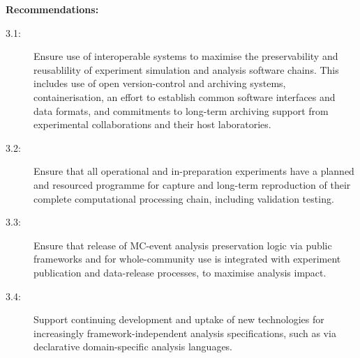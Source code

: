 \documentclass[11pt]{article}
\begin{document}


\noindent
\textbf{Recommendations:}


\begin{description}
   \item[3.1:] Ensure use of interoperable systems to maximise the preservability and reusablility of experiment simulation and analysis software chains. This includes use of open version-control and archiving systems, containerisation, an effort to establish common software interfaces and data formats, and commitments to long-term archiving support from experimental collaborations and their host laboratories.
   
   \item[3.2:] Ensure that all operational and in-preparation experiments have a planned and resourced programme for capture and long-term reproduction of their complete computational processing chain, including validation testing.
   
   \item[3.3:] Ensure that release of MC-event \gls{analysis preservation} logic via public frameworks and for whole-community use is integrated with experiment publication and data-release processes, to maximise analysis impact.
   \item[3.4:] Support continuing development and uptake of new technologies for increasingly framework-independent analysis specifications, such as via declarative domain-specific analysis languages.
   
\end{description}
\end{document}
